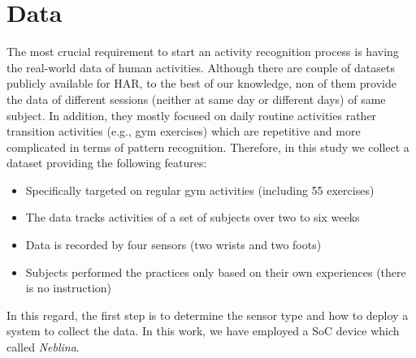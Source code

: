 \documentclass[journal,article,submit,moreauthors,pdftex]{Definitions/mdpi}
\begin{document}
\section{Data}

The most crucial requirement to start an activity recognition process is having the real-world data of human activities. Although there are couple of datasets publicly available for HAR\cite{wang2019survey}, to the best of our knowledge, non of them provide the data of different sessions (neither at same day or different days) of same subject. In addition, they mostly focused on daily routine activities rather transition activities (e.g., gym exercises) which are repetitive and more complicated in terms of pattern recognition\cite{wang2019survey}. Therefore, in this study we collect a dataset providing the following features:
\begin{itemize}[leftmargin=*,labelsep=5.8mm]
	\item Specifically targeted on regular gym activities (including 55 exercises)
	\item The data tracks activities of a set of subjects over two to six weeks
	\item Data is recorded by four sensors (two wrists and two foots)
	\item Subjects performed the practices only based on their own experiences (there is no instruction) 
\end{itemize}
In this regard, the first step is to determine the sensor type and how to deploy a system to collect the data. In this work, we have employed a SoC device which called \textit{Neblina}.
\end{document}
